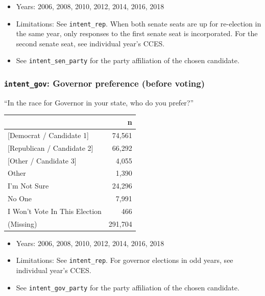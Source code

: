 \documentclass[10pt,article,oneside]{memoir}
\theoremstyle{definition}
\begin{document}
\begin{itemize}
\tightlist
\item
  Years: 2006, 2008, 2010, 2012, 2014, 2016, 2018
\item
  Limitations: See \texttt{intent\_rep}. When both senate seats are up
  for re-election in the same year, only responses to the first senate
  seat is incorporated. For the second senate seat, see individual
  year's CCES.
\item
  See \texttt{intent\_sen\_party} for the party affiliation of the
  chosen candidate.
\end{itemize}

\hypertarget{intent_gov-governor-preference-before-voting}{%
\subsubsection{\texorpdfstring{\texttt{intent\_gov}: Governor preference
(before
voting)}{intent\_gov: Governor preference (before voting)}}\label{intent_gov-governor-preference-before-voting}}

``In the race for Governor in your state, who do you prefer?''

\begin{table}[H]
\centering
\begin{tabular}{lr}
\toprule
 & n\\
\midrule
{[Democrat / Candidate 1]} & 74,561\\
{[Republican / Candidate 2]} & 66,292\\
{[Other / Candidate 3]} & 4,055\\
Other & 1,390\\
I'm Not Sure & 24,296\\
No One & 7,991\\
I Won't Vote In This Election & 466\\
(Missing) & 291,704\\
\bottomrule
\end{tabular}
\end{table}

\begin{itemize}
\tightlist
\item
  Years: 2006, 2008, 2010, 2012, 2014, 2016, 2018
\item
  Limitations: See \texttt{intent\_rep}. For governor elections in odd
  years, see individual year's CCES.
\item
  See \texttt{intent\_gov\_party} for the party affiliation of the
  chosen candidate.
\end{itemize}
\end{document}
